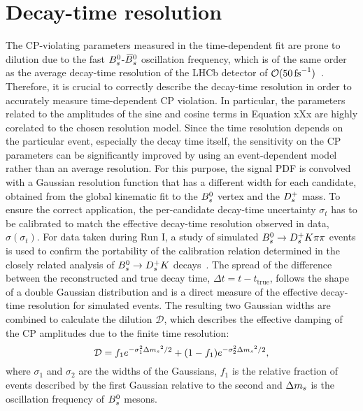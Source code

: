 \section{Decay-time resolution}
\label{sec:Resolution}

The CP-violating parameters measured in the time-dependent fit are prone to dilution due to the fast ${{B}^0_{s}}$-${{\kern 0.18em\overline{\kern -0.18em B}{}}{}^0_{s}}$ oscillation frequency, 
which is of the same order as the average decay-time resolution of the LHCb detector of $\mathcal{O}(50 \text{\,fs}^{-1})$~\cite{LHCb-DP-2014-002}.
Therefore, it is crucial to correctly describe the decay-time resolution in order to accurately measure time-dependent CP violation.
In particular, the parameters related to the amplitudes of the sine and cosine terms in Equation xXx are highly corelated to the chosen resolution model.
Since the time resolution depends on the particular event, especially the decay time itself,
the sensitivity on the CP parameters can be significantly improved by using an event-dependent model rather than an average resolution.
For this purpose, the signal PDF is convolved with a Gaussian resolution function that has a different width for each candidate, 
obtained from the global kinematic fit to the ${{B}^0_{s}}$ vertex and the ${{D}^+_{s}}$ mass.
To ensure the correct application, the per-candidate decay-time uncertainty $\sigma_{t}$ has to be calibrated to match the effective decay-time resolution observed in data, $\sigma(\sigma_{t})$.\newline
For data taken during Run I, 
a study of simulated ${{B}^0_{s}}\rightarrow{\ensuremath{{D}^+_{s}}}{\ensuremath{K}}{\ensuremath{\pi}}{\ensuremath{\pi}}$ events is used to confirm the portability of the calibration relation determined in the closely related analysis of ${{B}^0_{s}}\rightarrow{\ensuremath{{D}^+_{s}}}{\ensuremath{K}}$ decays~\cite{Aaij:2017lff}.
The spread of the difference between the reconstructed and true decay time, $\Delta t = t - t_{\text{true}}$, 
follows the shape of a double Gaussian distribution and is a direct measure of the effective decay-time resolution for simulated events. 
The resulting two Gaussian widths are combined to calculate the dilution $\mathcal{D}$, which describes the effective damping of the CP amplitudes due to the finite time resolution:
\begin{equation}
\mathcal{D} = f_{1}e^{-\sigma_{1}^{2}{\Delta m_{{s}}}^{2}/2} + (1 - f_{1}) e^{-\sigma_{2}^{2}{\Delta m_{{s}}}^{2}/2},
\label{eq:t-dilution}
\end{equation}
where $\sigma_{1}$ and $\sigma_{2}$ are the widths of the Gaussians, $f_{1}$ is the relative fraction of events described by the first Gaussian relative to the second and ${\Delta m_{{s}}}$ is the oscillation frequency of ${{B}^0_{s}}$ mesons.
